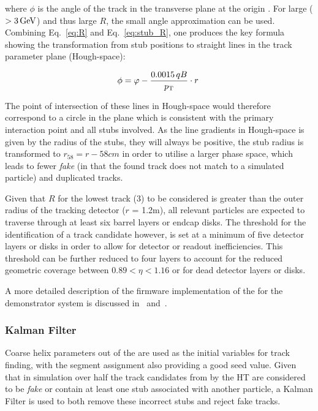where $\phi$ is the angle of the track in the transverse plane at the origin \cite{markthesis}. 
For large \pT ($> 3\,\text{Ge\hspace{-.08em}V}$) and thus large $R$, the small angle approximation can be used. Combining Eq.~\ref{eq:R} and Eq.~\ref{eq:stub_R}, one produces the key formula showing the transformation from stub positions to straight lines in the track parameter plane (Hough-space):

\begin{equation}
\phi = \varphi - \frac{0.0015\,qB}{p_{\mathrm{T}}}\cdot r \;
\label{eq:localHT}
\end{equation}

The point of intersection of these lines in Hough-space would therefore correspond to a circle in the \rphi plane which is consistent with the primary interaction point and all stubs involved.
As the line gradients in Hough-space is given by the radius of the stubs, they will always be positive, the stub radius is transformed to $r_{58} = r - 58cm$ in order to utilise a larger phase space, which leads to fewer \textit{fake} (in that the found track does not match to a simulated particle) and duplicated tracks.

Given that $R$ for the lowest \pT track (3\GeV) to be considered is greater than the outer radius of the tracking detector ($r$ = 1.2m), all relevant particles are expected to traverse through at least six barrel layers or endcap disks. 
The threshold for the identification of a track candidate however, is set at a minimum of five detector layers or disks in order to allow for detector or readout inefficiencies. 
This threshold can be further reduced to four layers to account for the reduced geometric coverage between $0.89 < \eta < 1.16$ or for dead detector layers or disks.

A more detailed description of the firmware implementation of the \HT for the demonstrator system is discussed in~\cite{IEEE} and~\cite{TMTT_JINST}.

\subsubsection{Kalman Filter}\label{subsubsec:KF}
Coarse \rphi helix parameters out of the \HT are used as the initial variables for track finding, with the segment assignment also providing a good seed value.
Given that in simulation over half the track candidates from by the HT are considered to be \textit{fake} or contain at least one stub associated with another particle, a Kalman Filter is used to both remove these incorrect stubs and reject fake tracks. 

